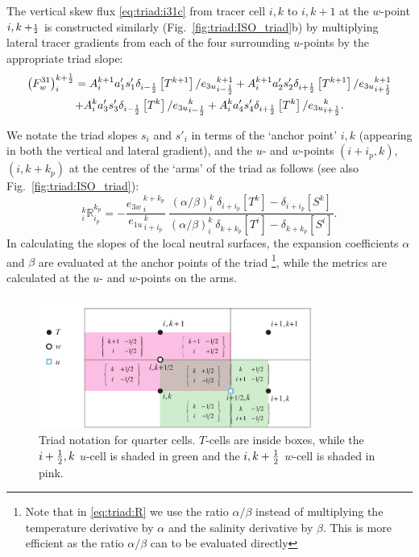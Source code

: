  The vertical skew flux \eqref{eq:triad:i31c} from tracer cell $i,k$ to $i,k+1$ at the
$w$-point $i,k+\scriptstyle\frac{1}{2}$ is constructed similarly (Fig.~\ref{fig:triad:ISO_triad}b)
by multiplying lateral tracer gradients from each of the four
surrounding $u$-points by the appropriate triad slope:
\begin{multline}
  \label{eq:triad:i31}
  \left( F_w^{31} \right) _i ^{k+\frac{1}{2}} =  {A}_i^{k+1} a_{1}'
  s_{1}' \delta _{i-\frac{1}{2}} \left[ T^{k+1} \right]/{e_{3u}}_{i-\frac{1}{2}}^{k+1}
   +{A}_i^{k+1} a_{2}' s_{2}' \delta _{i+\frac{1}{2}} \left[ T^{k+1} \right]/{e_{3u}}_{i+\frac{1}{2}}^{k+1}\\
  + {A}_i^k a_{3}' s_{3}' \delta _{i-\frac{1}{2}} \left[ T^k\right]/{e_{3u}}_{i-\frac{1}{2}}^k
  +{A}_i^k a_{4}' s_{4}' \delta _{i+\frac{1}{2}} \left[ T^k \right]/{e_{3u}}_{i+\frac{1}{2}}^k.
\end{multline}

We notate the triad slopes $s_i$ and $s'_i$ in terms of the `anchor point' $i,k$
(appearing in both the vertical and lateral gradient), and the $u$- and
$w$-points $(i+i_p,k)$, $(i,k+k_p)$ at the centres of the `arms' of the
triad as follows (see also Fig.~\ref{fig:triad:ISO_triad}):
\begin{equation}
  \label{eq:triad:R}
  _i^k \mathbb{R}_{i_p}^{k_p}
  =-\frac{ {e_{3w}}_{\,i}^{\,k+k_p}} { {e_{1u}}_{\,i+i_p}^{\,k}}
  \
  \frac
  {\left(\alpha / \beta \right)_i^k  \ \delta_{i + i_p}[T^k] - \delta_{i + i_p}[S^k] }
  {\left(\alpha / \beta \right)_i^k  \ \delta_{k+k_p}[T^i ] - \delta_{k+k_p}[S^i ] }.
\end{equation}
In calculating the slopes of the local neutral
surfaces, the expansion coefficients $\alpha$ and $\beta$ are
evaluated at the anchor points of the triad \footnote{Note that in \eqref{eq:triad:R} we use the ratio $\alpha / \beta$
instead of multiplying the temperature derivative by $\alpha$ and the
salinity derivative by $\beta$. This is more efficient as the ratio
$\alpha / \beta$ can to be evaluated directly}, while the metrics are
calculated at the $u$- and $w$-points on the arms.

\begin{figure}[h] \begin{center}
    \includegraphics[width=0.80\textwidth]{./TexFiles/Figures/Fig_GRIFF_qcells}
    \caption{   \label{fig:triad:qcells}
    Triad notation for quarter cells. $T$-cells are inside
      boxes, while the  $i+\textstyle\frac{1}{2},k$ $u$-cell is shaded in green and the
      $i,k+\textstyle\frac{1}{2}$ $w$-cell is shaded in pink.}
  \end{center} \end{figure}

